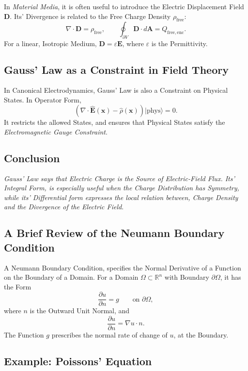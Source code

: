 \documentclass[a4paper, 10pt, onepage]{elegantbook}
\begin{document}
{In \emph{Material Media}, it is often useful to introduce the Electric Displacement Field \(\mathbf{D}\). Its' 
Divergence is related to the Free Charge Density
\(\rho_{\mathrm{free}}\):
\[
\nabla\cdot\mathbf{D}=\rho_{\mathrm{free}},
\qquad
\oint_{\partial V}\mathbf{D}\cdot d\mathbf{A}
=Q_{\mathrm{free,enc}}.
\]
For a linear, Isotropic Medium, \(\mathbf{D}=\varepsilon\mathbf{E}\),
where \(\varepsilon\) is the Permittivity.

\subsection{Gauss' Law as a Constraint in Field Theory}

In Canonical Electrodynamics, Gauss' Law is also a Constraint on
Physical States. In Operator Form,
\[
\left(\nabla\cdot\hat{\mathbf{E}}(\mathbf{x})
-\hat{\rho}(\mathbf{x})\right)|\mathrm{phys}\rangle=0.
\]
It restricts the allowed States, and ensures that Physical States satisfy the \emph{Electromagnetic Gauge Constraint}.

\subsection{Conclusion}

\emph{Gauss' Law says that Electric Charge is the Source of Electric-Field Flux. Its' Integral Form, is especially 
useful when the Charge Distribution has Symmetry, while its' Differential form expresses the local relation between, 
Charge Density and the Divergence of the Electric Field}.

\subsection{A Brief Review of the Neumann Boundary Condition}

A Neumann Boundary Condition, specifies the Normal Derivative of a Function on the Boundary of a Domain. For a Domain
\(\Omega\subset\mathbb{R}^n\) with Boundary \(\partial\Omega\), it has
the Form
\[
\frac{\partial u}{\partial n}=g
\qquad \text{on } \partial\Omega,
\]
where \(n\) is the Outward Unit Normal, and
\[
\frac{\partial u}{\partial n}
=\nabla u\cdot n.
\]
The Function \(g\) prescribes the normal rate of change of \(u\), at
the Boundary.

\subsection{Example: Poissons' Equation}

}
\end{document}
